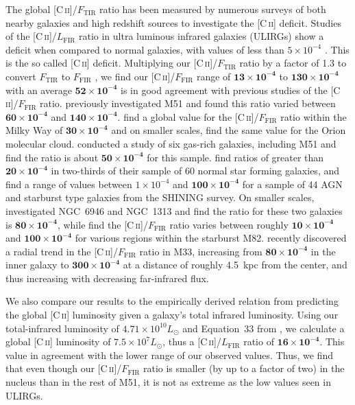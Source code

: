 \documentclass[preprint2]{aastex}
\begin{document}
The global [C\,\textsc{ii}]/$F_{\mathrm{TIR}}$ ratio has been measured by numerous surveys of both nearby galaxies and high redshift sources to investigate the [C\,\textsc{ii}] deficit.  Studies of the [C\,\textsc{ii}]/$L_{\mathrm{FIR}}$ ratio in ultra luminous infrared galaxies (ULIRGs) show a deficit when compared to normal galaxies, with values of less than $5 \times 10^{-4}$ \citep[e.g.][]{1998ApJ...504L..11L,2003ApJ...594..758L}.  This is the so called [C\,\textsc{ii}] deficit.  Multiplying our [C\,\textsc{ii}]/$F_{\mathrm{TIR}}$ ratio by a factor of 1.3 to convert $F_{\mathrm{TIR}}$ to $F_{\mathrm{FIR}}$ \citep{2008A&A...479..703G}, we find our [C\,\textsc{ii}]/$F_{\mathrm{FIR}}$ range of $\mathbf{13 \times 10^{-4}}$ to $\mathbf{130 \times 10^{-4}}$ with an average $\mathbf{52 \times 10^{-4}}$ is in good agreement with previous studies of the [C\,\textsc{ii}]/$F_{\mathrm{FIR}}$ ratio.  \citet{2001ApJ...561..203N} previously investigated M51 and found this ratio varied between $\mathbf{60 \times 10^{-4}}$ and $\mathbf{140 \times 10^{-4}}$.  \citet{1985ApJ...289..803S} find a global value for the [C\,\textsc{ii}]/$F_{\mathrm{FIR}}$ ratio within the Milky Way of $\mathbf{30 \times 10^{-4}}$ and on smaller scales, \citet{1993ApJ...404..219S} find the same value for the Orion molecular cloud.  \citet{1985ApJ...291..755C} conducted a study of six gas-rich galaxies, including M51 and find the ratio is about $\mathbf{50 \times 10^{-4}}$ for this sample. \citet{2001ApJ...561..766M} find ratios of greater than $\mathbf{20 \times 10^{-4}}$ in two-thirds of their sample of 60 normal star forming galaxies, and \citet{2011ApJ...728L...7G} find a range of values between $1 \times 10^{-4}$ and $\mathbf{100 \times 10^{-4}}$ for a sample of 44 AGN and starburst type galaxies from the SHINING survey.  On smaller scales, \citet{2002AJ....124..751C} investigated NGC~6946 and NGC~1313 and find the ratio for these two galaxies is $\mathbf{80 \times 10^{-4}}$, while \citet{2013A&A...549A.118C} find the [C\,\textsc{ii}]/$F_{\mathrm{FIR}}$ ratio varies between roughly $\mathbf{10 \times 10^{-4}}$ and $\mathbf{100 \times 10^{-4}}$ for various regions within the starburst M82.  \citet{2013A&A...553A.114K} recently discovered a radial trend in the [C\,\textsc{ii}]/$F_{\mathrm{FIR}}$ ratio in M33, increasing from $\mathbf{80 \times 10^{-4}}$ in the inner galaxy to $\mathbf{300 \times 10^{-4}}$ at a distance of roughly 4.5~kpc from the center, and thus increasing with decreasing far-infrared flux.

We also compare our results to the empirically derived relation from \citet{2012ApJ...745..171S} predicting the global [C\,\textsc{ii}] luminosity given a galaxy's total infrared luminosity.  Using our total-infrared luminosity of $4.71 \times 10^{10} L_{\odot}$ and Equation~33 from \citet{2012ApJ...745..171S}, we calculate a global [C\,\textsc{ii}] luminosity of $7.5 \times 10^{7} L_{\odot}$, thus a [C\,\textsc{ii}]/$L_{\mathrm{FIR}}$ ratio of $\mathbf{16 \times 10^{-4}}$.  This value in agreement with the lower range of our observed values.  Thus, we find that even though our [C\,\textsc{ii}]/$F_{\mathrm{FIR}}$ ratio is smaller (by up to a factor of two) in the nucleus than in the rest of M51, it is not as extreme as the low values seen in ULIRGs.
\end{document}

